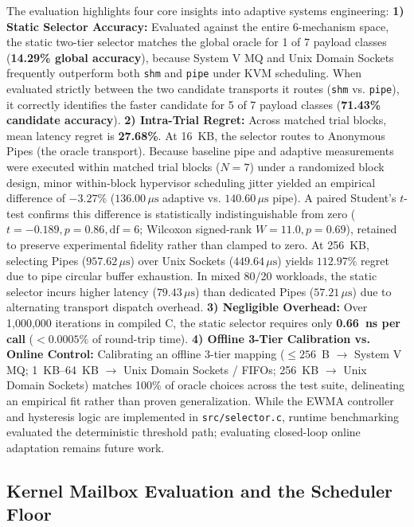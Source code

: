 The evaluation highlights four core insights into adaptive systems engineering:
\textbf{1) Static Selector Accuracy:} Evaluated against the entire 6-mechanism space, the static two-tier selector matches the global oracle for 1 of 7 payload classes (\textbf{14.29\% global accuracy}), because System V MQ and Unix Domain Sockets frequently outperform both \texttt{shm} and \texttt{pipe} under KVM scheduling. When evaluated strictly between the two candidate transports it routes (\texttt{shm} vs. \texttt{pipe}), it correctly identifies the faster candidate for 5 of 7 payload classes (\textbf{71.43\% candidate accuracy}).
\textbf{2) Intra-Trial Regret:} Across matched trial blocks, mean latency regret is \textbf{27.68\%}. At 16~KB, the selector routes to Anonymous Pipes (the oracle transport). Because baseline pipe and adaptive measurements were executed within matched trial blocks ($N=7$) under a randomized block design, minor within-block hypervisor scheduling jitter yielded an empirical difference of $-3.27\%$ ($136.00\,\mu\text{s}$ adaptive vs. $140.60\,\mu\text{s}$ pipe). A paired Student's $t$-test confirms this difference is statistically indistinguishable from zero ($t = -0.189, p = 0.86, \text{df} = 6$; Wilcoxon signed-rank $W = 11.0, p = 0.69$), retained to preserve experimental fidelity rather than clamped to zero. At 256~KB, selecting Pipes ($957.62\,\mu\text{s}$) over Unix Sockets ($449.64\,\mu\text{s}$) yields $112.97\%$ regret due to pipe circular buffer exhaustion. In mixed 80/20 workloads, the static selector incurs higher latency ($79.43\,\mu\text{s}$) than dedicated Pipes ($57.21\,\mu\text{s}$) due to alternating transport dispatch overhead.
\textbf{3) Negligible Overhead:} Over 1,000,000 iterations in compiled C, the static selector requires only \textbf{0.66~ns per call} ($< 0.0005\%$ of round-trip time).
\textbf{4) Offline 3-Tier Calibration vs. Online Control:} Calibrating an offline 3-tier mapping ($\le 256$~B $\to$ System V MQ; 1~KB--64~KB $\to$ Unix Domain Sockets / FIFOs; 256~KB $\to$ Unix Domain Sockets) matches 100\% of oracle choices across the test suite, delineating an empirical fit rather than proven generalization. While the EWMA controller and hysteresis logic are implemented in \texttt{src/selector.c}, runtime benchmarking evaluated the deterministic threshold path; evaluating closed-loop online adaptation remains future work.

\subsection{Kernel Mailbox Evaluation and the Scheduler Floor}

